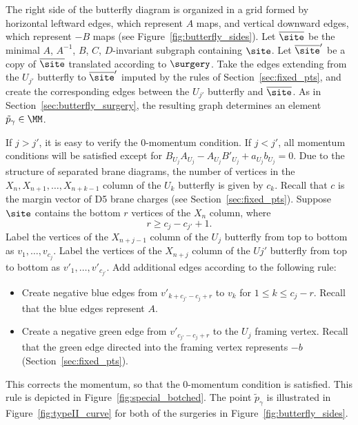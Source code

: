 The right side of the butterfly diagram is organized in a grid formed by horizontal leftward edges, which represent $A$ maps, and vertical downward edges, which represent $-B$ maps (see Figure~\ref{fig:butterfly_sides}). Let $\overline\site$ be the minimal $A$, $A^{-1}$, $B$, $C$, $D$-invariant subgraph containing $\site$. Let $\overline\site'$ be a copy of $\overline\site$ translated according to $\surgery$. Take the edges extending from the $U_{j'}$ butterfly to $\overline\site'$ imputed by the rules of Section~\ref{sec:fixed_pts}, and create the corresponding edges between the $U_{j'}$ butterfly and $\overline\site$. As in Section~\ref{sec:butterfly_surgery}, the resulting graph determines an element $\tilde{p}_\gamma \in \MM$.

If $j>j'$, it is easy to verify the 0-momentum condition. If $j<j'$, all momentum conditions will be satisfied except for $B_{U_{j}}A_{U_{j}} - A_{U_{j}}B'_{U_{j}} + a_{U_{j}}b_{U_{j}} = 0$. Due to the structure of separated brane diagrams, the number of vertices in the $X_n, X_{n+1}, \dots , X_{n+k-1}$ column of the $U_k$ butterfly is given by $c_k$. Recall that $c$ is the margin vector of D5 brane charges (see Section~\ref{sec:fixed_pts}). Suppose~$\site$ contains the bottom $r$ vertices of the $X_n$ column, where
\begin{equation} \label{eqn:typeII_constraint}
r \geq c_j - c_{j'} + 1.
\end{equation}
Label the vertices of the $X_{n+j-1}$ column of the $U_j$ butterfly from top to bottom as $v_1, \dots , v_{c_j}$. Label the vertices of the $X_{n+j}$ column of the $U{j'}$ butterfly from top to bottom as $v'_1, \dots , v'_{c_{j'}}$. Add additional edges according to the following rule:
\begin{itemize}\itemsep=0pt
\item Create negative blue edges from $v'_{k + c_{j'} - c_j + r}$ to $v_k$ for $1 \leq k \leq c_j - r$. Recall that the blue edges represent $A$.
\item Create a negative green edge from $v'_{c_{j'} - c_j + r}$ to the $U_j$ framing vertex. Recall that the green edge directed into the framing vertex represents $-b$ (Section~\ref{sec:fixed_pts}).
\end{itemize}
This corrects the momentum, so that the 0-momentum condition is satisfied. This rule is depicted in Figure~\ref{fig:special_botched}. The point $\tilde{p}_\gamma$ is illustrated in Figure~\ref{fig:typeII_curve} for both of the surgeries in Figure~\ref{fig:butterfly_sides}.

